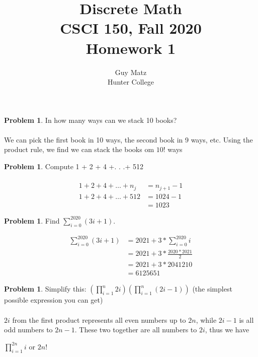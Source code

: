 \documentclass[10pt,leqno ]{article}
\title{Discrete Math\\
CSCI 150, Fall 2020\\
Homework 1}
\author{Guy Matz \\
Hunter College}
\theoremstyle{definition}
\newtheorem{problem}[theorem]{Problem}
\begin{document}



\begin{problem} In how many ways can we stack 10 books?\\
\\
We can pick the first book in 10 ways, the second book in 9 ways, etc.  Using the product rule, we find we can stack the books om $10!$ ways
\end{problem}

\newpage
\begin{problem} Compute 1 + 2 + 4 +. . .+ 512
\\\\
\begin{align*}
1 + 2 + 4 + \dots + n_j &= n_{j+1} - 1
\\
1 + 2 + 4 + \dots + 512 &= 1024 - 1
\\                      &= 1023
\end{align*}
\end{problem}
\newpage

\begin{problem} Find $\sum_{i=0}^{2020}(3i+ 1)$.

\begin{align*}
\sum_{i=0}^{2020}(3i+ 1) &= 2021 + 3 * \sum_{i=0}^{2020}i
                         \\
                         &= 2021 + 3 * \frac{2020 * 2021}{2}
                         \\
                         &= 2021 + 3 * 2041210
                         \\
                         &= 6125651
\end{align*}

\end{problem}
\newpage

\begin{problem} Simplify this: $\left(\prod_{i=1}^{n}2i\right)\left(\prod_{i=1}^{n}(2i-1)\right)$ (the simplest possible expression you can get)
\\\\
$2i$ from the first product represents all even numbers up to $2n$, while $2i-1$ is all odd numbers to $2n-1$.  These two together are all numbers to $2i$, thus we have  
\begin{center}
$\prod_{i=1}^{2n}i$ or $2n!$
\end{center}

\end{problem}
\newpage
\end{document}
